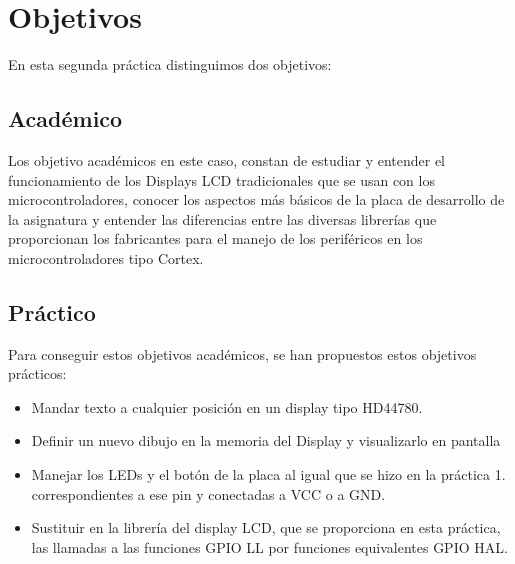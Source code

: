 \documentclass[11pt,a4paper]{article}
\begin{document}
	\section{Objetivos}
	\large{
		En esta segunda práctica distinguimos dos objetivos:
		
		\subsection{Académico}
		Los objetivo académicos en este caso, constan de estudiar y entender el funcionamiento de los Displays LCD tradicionales que se usan con los microcontroladores, conocer los aspectos más básicos de la placa de desarrollo de la asignatura y entender las diferencias entre las diversas librerías que proporcionan los fabricantes para el manejo de los periféricos en los microcontroladores tipo Cortex.
		
		\subsection{Práctico}
		Para conseguir estos objetivos académicos, se han propuestos estos objetivos prácticos:
		\begin{itemize}
		\item Mandar texto a cualquier posición en un display tipo HD44780.
		\item Definir un nuevo dibujo en la memoria del Display y visualizarlo en pantalla
		\item Manejar los LEDs y el botón de la placa al igual que se hizo en la práctica 1.
		correspondientes a ese pin y conectadas a VCC o a GND.
		\item Sustituir en la librería del display LCD, que se proporciona en esta práctica, las llamadas a las funciones GPIO LL por funciones equivalentes GPIO HAL.
		\end{itemize}
	}
	
\end{document}

